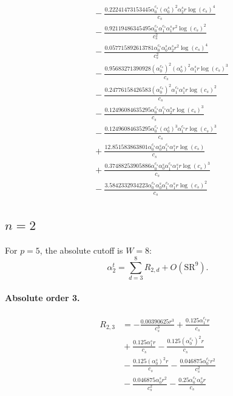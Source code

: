 \documentclass[10pt]{article}
\begin{document}
\begin{align*}
&{}  - \frac{0.22241473153445 \alpha_{0}^{c_s} \left(\alpha_{0}^s\right)^{2} \alpha_{2}^s r \log{\left(c_{s} \right)}^{4}}{c_{s}} \\
&{}  - \frac{0.92119486345495 \alpha_{0}^{c_s} \alpha_{1}^{c_s} \alpha_{1}^s r^{2} \log{\left(c_{s} \right)}^{2}}{c_{s}^{2}} \\
&{}  - \frac{0.057715892613781 \alpha_{0}^{c_s} \alpha_{0}^s \alpha_{2}^s r^{2} \log{\left(c_{s} \right)}^{4}}{c_{s}^{2}} \\
&{}  - \frac{0.95683271390928 \left(\alpha_{0}^{c_s}\right)^{2} \left(\alpha_{0}^s\right)^{2} \alpha_{1}^s r \log{\left(c_{s} \right)}^{3}}{c_{s}} \\
&{}  - \frac{0.24776158426583 \left(\alpha_{0}^{c_s}\right)^{2} \alpha_{1}^{c_s} \alpha_{1}^s r \log{\left(c_{s} \right)}^{2}}{c_{s}} \\
&{}  - \frac{0.12496084635295 \alpha_{0}^{c_s} \alpha_{1}^{c_s} \alpha_{2}^s r \log{\left(c_{s} \right)}^{3}}{c_{s}} \\
&{}  - \frac{0.12496084635295 \alpha_{0}^{c_s} \left(\alpha_{0}^s\right)^{3} \alpha_{1}^{c_s} r \log{\left(c_{s} \right)}^{3}}{c_{s}} \\
&{}  + \frac{12.851583863801 \alpha_{0}^{c_s} \alpha_{0}^s \alpha_{1}^{c_s} \alpha_{1}^s r \log{\left(c_{s} \right)}}{c_{s}} \\
&{}  + \frac{0.37488253905886 \alpha_{0}^{c_s} \alpha_{0}^s \alpha_{1}^{c_s} \alpha_{1}^s r \log{\left(c_{s} \right)}^{3}}{c_{s}} \\
&{}  - \frac{3.5842332934223 \alpha_{0}^{c_s} \alpha_{0}^s \alpha_{1}^{c_s} \alpha_{1}^s r \log{\left(c_{s} \right)}^{2}}{c_{s}}
\end{align*}

\subsection{$n=2$}
For $p=5$, the absolute cutoff is $W=8$:
\[\alpha_{2}^t=\sum_{d=3}^{8}R_{2,d}+O(\mathrm{SR}^{9}).\]
\paragraph{Absolute order 3.}
\begin{align*}
R_{2,3} &=  - \frac{0.00390625 r^{3}}{c_{s}^{3}} + \frac{0.125 \alpha_{1}^{c_s} r}{c_{s}} \\
&{}  + \frac{0.125 \alpha_{1}^s r}{c_{s}} - \frac{0.125 \left(\alpha_{0}^{c_s}\right)^{2} r}{c_{s}} \\
&{}  - \frac{0.125 \left(\alpha_{0}^s\right)^{2} r}{c_{s}} - \frac{0.046875 \alpha_{0}^{c_s} r^{2}}{c_{s}^{2}} \\
&{}  - \frac{0.046875 \alpha_{0}^s r^{2}}{c_{s}^{2}} - \frac{0.25 \alpha_{0}^{c_s} \alpha_{0}^s r}{c_{s}}
\end{align*}
\end{document}
